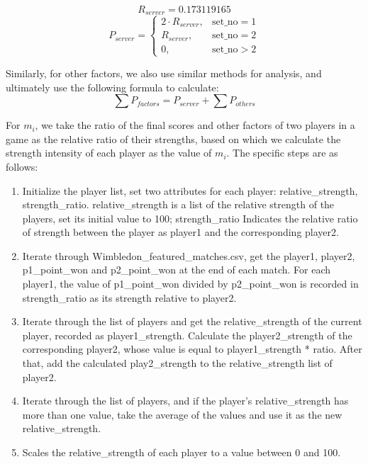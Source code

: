 \begin{equation}
R_{server}=0.173119165
\end{equation}
\begin{equation}\left.P_{server}=\left\{\begin{array}{ll}2\cdot R_{server},&\text{set\_no}=1\\R_{server},&\text{set\_no}=2\\0,&\text{set\_no}>2\end{array}\right.\right.\end{equation}

Similarly, for other factors, we also use similar methods for analysis, and ultimately use the following formula to calculate:
\begin{equation}
 \sum P_{factors} = P_{server} + \sum P_{others} 
\end{equation}

For $m_i$, we take the ratio of the final scores and other factors of two players in a game as the relative ratio of their strengths, based on which we calculate the strength intensity of each player as the value of $m_i$. The specific steps are as follows:


\begin{enumerate}
  \item Initialize the player list, set two attributes for each player: relative\_strength, strength\_ratio. relative\_strength is a list of the relative strength of the players, set its initial value to 100; strength\_ratio Indicates the relative ratio of strength between the player as player1 and the corresponding player2.
  \item Iterate through Wimbledon\_featured\_matches.csv, get the player1, player2, p1\_point\_won and p2\_point\_won at the end of each match. For each player1, the value of p1\_point\_won divided by p2\_point\_won is recorded in strength\_ratio as its strength relative to player2.
  \item Iterate through the list of players and get the relative\_strength of the current player, recorded as player1\_strength. Calculate the player2\_strength of the corresponding player2, whose value is equal to player1\_strength * ratio. After that, add the calculated play2\_strength to the relative\_strength list of player2.
  \item Iterate through the list of players, and if the player's relative\_strength has more than one value, take the average of the values and use it as the new relative\_strength.
  \item Scales the relative\_strength of each player to a value between 0 and 100.
\end{enumerate}

